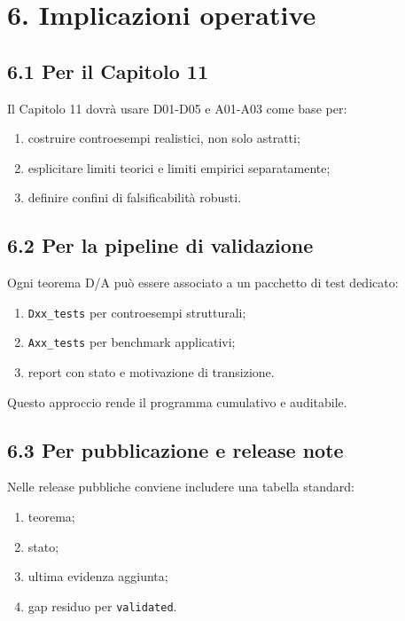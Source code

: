 \section{6. Implicazioni operative}

\subsection{6.1 Per il Capitolo 11}

Il Capitolo 11 dovrà usare D01-D05 e A01-A03 come base per:

\begin{enumerate}
\def\labelenumi{\arabic{enumi}.}
\tightlist
\item
  costruire controesempi realistici, non solo astratti;
\item
  esplicitare limiti teorici e limiti empirici separatamente;
\item
  definire confini di falsificabilità robusti.
\end{enumerate}

\subsection{6.2 Per la pipeline di validazione}

Ogni teorema D/A può essere associato a un pacchetto di test dedicato:

\begin{enumerate}
\def\labelenumi{\arabic{enumi}.}
\tightlist
\item
  \texttt{Dxx\_tests} per controesempi strutturali;
\item
  \texttt{Axx\_tests} per benchmark applicativi;
\item
  report con stato e motivazione di transizione.
\end{enumerate}

Questo approccio rende il programma cumulativo e auditabile.

\subsection{6.3 Per pubblicazione e release note}

Nelle release pubbliche conviene includere una tabella standard:

\begin{enumerate}
\def\labelenumi{\arabic{enumi}.}
\tightlist
\item
  teorema;
\item
  stato;
\item
  ultima evidenza aggiunta;
\item
  gap residuo per \texttt{validated}.
\end{enumerate}

